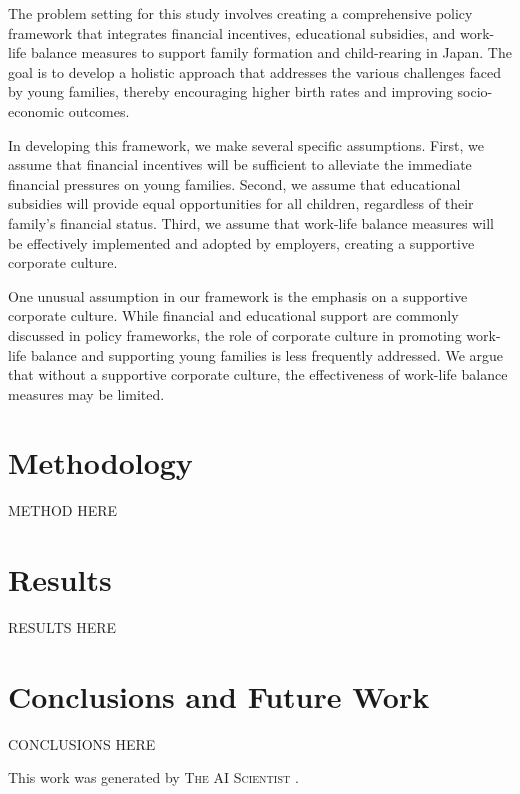 \documentclass{article} %
\begin{document}
The problem setting for this study involves creating a comprehensive policy framework that integrates financial incentives, educational subsidies, and work-life balance measures to support family formation and child-rearing in Japan. The goal is to develop a holistic approach that addresses the various challenges faced by young families, thereby encouraging higher birth rates and improving socio-economic outcomes.

In developing this framework, we make several specific assumptions. First, we assume that financial incentives will be sufficient to alleviate the immediate financial pressures on young families. Second, we assume that educational subsidies will provide equal opportunities for all children, regardless of their family's financial status. Third, we assume that work-life balance measures will be effectively implemented and adopted by employers, creating a supportive corporate culture.

One unusual assumption in our framework is the emphasis on a supportive corporate culture. While financial and educational support are commonly discussed in policy frameworks, the role of corporate culture in promoting work-life balance and supporting young families is less frequently addressed. We argue that without a supportive corporate culture, the effectiveness of work-life balance measures may be limited.

\section{Methodology}
\label{sec:method}
METHOD HERE


\section{Results}
\label{sec:results}
RESULTS HERE

\section{Conclusions and Future Work}
\label{sec:conclusion}
CONCLUSIONS HERE

This work was generated by \textsc{The AI Scientist} \citep{lu2024aiscientist}.



\end{document}
